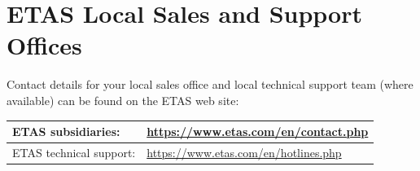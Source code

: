 \vfill

\section{ETAS Local Sales and Support Offices}
Contact details for your local sales office and local technical support team (where available) can be found on the ETAS web site:

\begin{tabular}{ | p{6.9cm} | p{8cm} | }
	\hline
	ETAS subsidiaries: & \url{https://www.etas.com/en/contact.php} \\ \hline
	ETAS technical support: & \url{https://www.etas.com/en/hotlines.php} \\ 
	\hline
\end{tabular}